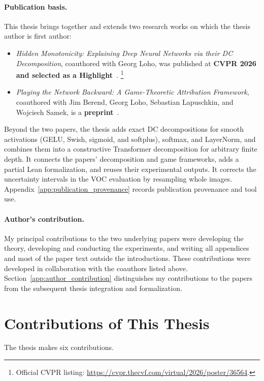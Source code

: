 \paragraph{Publication basis.}
This thesis brings together and extends two research works on which the thesis author is first author:
\begin{itemize}
\item \emph{Hidden Monotonicity: Explaining Deep Neural Networks via their DC Decomposition}, coauthored with Georg Loho, was published at \textbf{CVPR 2026 and selected as a Highlight}~\parencite{hiddenMono}. \footnote{Official CVPR listing: \url{https://cvpr.thecvf.com/virtual/2026/poster/36564}.}

\item \emph{Playing the Network Backward: A Game-Theoretic Attribution Framework}, coauthored with Jim Berend, Georg Loho, Sebastian Lapuschkin, and Wojciech Samek, is a \textbf{preprint}~\parencite{playingBackward2026}.
\end{itemize}
Beyond the two papers, the thesis adds exact DC decompositions for smooth activations (GELU, Swish, sigmoid, and softplus), softmax, and LayerNorm, and combines them into a constructive Transformer decomposition for arbitrary finite depth. It connects the papers' decomposition and game frameworks, adds a partial Lean formalization, and reuses their experimental outputs. It corrects the uncertainty intervals in the VOC evaluation by resampling whole images. Appendix~\ref{app:publication_provenance} records publication provenance and tool use.

\paragraph{Author's contribution.}
My principal contributions to the two underlying papers were developing the theory, developing and conducting the experiments, and writing all appendices and most of the paper text outside the introductions. These contributions were developed in collaboration with the coauthors listed above. Section~\ref{app:author_contribution} distinguishes my contributions to the papers from the subsequent thesis integration and formalization.

\section{Contributions of This Thesis}\label{sec:contributions}

The thesis makes six contributions.

